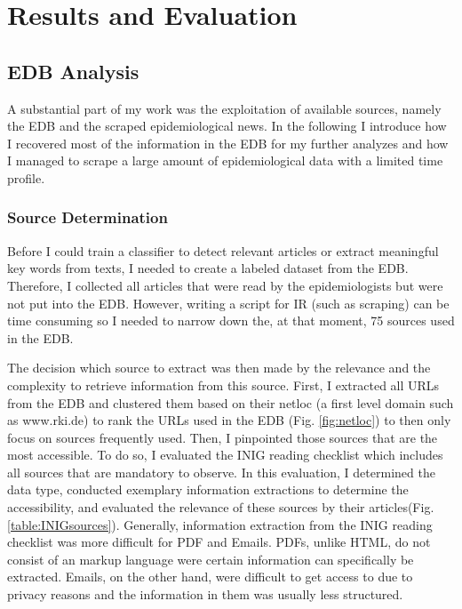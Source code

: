 \chapter{Results and Evaluation}

\section{EDB Analysis}\label{edb analysis}
  A substantial part of my work was the exploitation of available sources, namely the EDB and the scraped epidemiological news.
  In the following I introduce how I recovered most of the information in the EDB for my further analyzes and how I managed to scrape a large amount of epidemiological data with a limited time profile.

\subsection{Source Determination}
  Before I could train a classifier to detect relevant articles or extract meaningful key words from texts, I needed to create a labeled dataset from the EDB.
  Therefore, I collected all articles that were read by the epidemiologists but were not put into the EDB.
  However, writing a script for IR (such as scraping) can be time consuming so I needed to narrow down the, at that moment, 75 sources used in the EDB.

  The decision which source to extract was then made by the relevance and the complexity to retrieve information from this source.
  First, I extracted all URLs from the EDB and clustered them based on their netloc (a first level domain such as www.rki.de) to rank the URLs used in the EDB (Fig. \ref{fig:netloc}) to then only focus on sources frequently used.
  Then, I pinpointed those sources that are the most accessible.
  To do so, I evaluated the INIG reading checklist which includes all sources that are mandatory to observe.
  In this evaluation, I determined the data type, conducted exemplary information extractions to determine the accessibility, and evaluated the relevance of these sources by their articles(Fig. \ref{table:INIGsources}).
  Generally, information extraction from the INIG reading checklist was more difficult for PDF and Emails.
  PDFs, unlike HTML, do not consist of an markup language were certain information can specifically be extracted.
  Emails, on the other hand, were difficult to get access to due to privacy reasons and the information in them was usually less structured.

